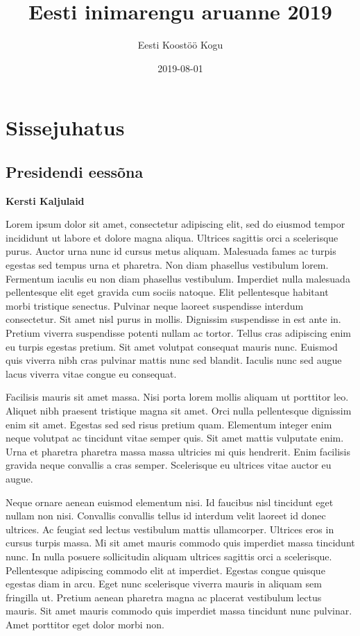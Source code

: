 \documentclass[]{book}
\title{Eesti inimarengu aruanne 2019}
\author{Eesti Koostöö Kogu}
\date{2019-08-01}
\begin{document}
\maketitle

{
\setcounter{tocdepth}{1}
\tableofcontents
}
\hypertarget{chapter00}{%
\chapter*{Sissejuhatus}\label{chapter00}}

\hypertarget{chapter01}{%
\section*{Presidendi eessõna}\label{chapter01}}

\begin{authors}
\textbf{Kersti Kaljulaid}
\end{authors}

Lorem ipsum dolor sit amet, consectetur adipiscing elit, sed do eiusmod tempor incididunt ut labore et dolore magna aliqua. Ultrices sagittis orci a scelerisque purus. Auctor urna nunc id cursus metus aliquam. Malesuada fames ac turpis egestas sed tempus urna et pharetra. Non diam phasellus vestibulum lorem. Fermentum iaculis eu non diam phasellus vestibulum. Imperdiet nulla malesuada pellentesque elit eget gravida cum sociis natoque. Elit pellentesque habitant morbi tristique senectus. Pulvinar neque laoreet suspendisse interdum consectetur. Sit amet nisl purus in mollis. Dignissim suspendisse in est ante in. Pretium viverra suspendisse potenti nullam ac tortor. Tellus cras adipiscing enim eu turpis egestas pretium. Sit amet volutpat consequat mauris nunc. Euismod quis viverra nibh cras pulvinar mattis nunc sed blandit. Iaculis nunc sed augue lacus viverra vitae congue eu consequat.

Facilisis mauris sit amet massa. Nisi porta lorem mollis aliquam ut porttitor leo. Aliquet nibh praesent tristique magna sit amet. Orci nulla pellentesque dignissim enim sit amet. Egestas sed sed risus pretium quam. Elementum integer enim neque volutpat ac tincidunt vitae semper quis. Sit amet mattis vulputate enim. Urna et pharetra pharetra massa massa ultricies mi quis hendrerit. Enim facilisis gravida neque convallis a cras semper. Scelerisque eu ultrices vitae auctor eu augue.

Neque ornare aenean euismod elementum nisi. Id faucibus nisl tincidunt eget nullam non nisi. Convallis convallis tellus id interdum velit laoreet id donec ultrices. Ac feugiat sed lectus vestibulum mattis ullamcorper. Ultrices eros in cursus turpis massa. Mi sit amet mauris commodo quis imperdiet massa tincidunt nunc. In nulla posuere sollicitudin aliquam ultrices sagittis orci a scelerisque. Pellentesque adipiscing commodo elit at imperdiet. Egestas congue quisque egestas diam in arcu. Eget nunc scelerisque viverra mauris in aliquam sem fringilla ut. Pretium aenean pharetra magna ac placerat vestibulum lectus mauris. Sit amet mauris commodo quis imperdiet massa tincidunt nunc pulvinar. Amet porttitor eget dolor morbi non.
\end{document}
